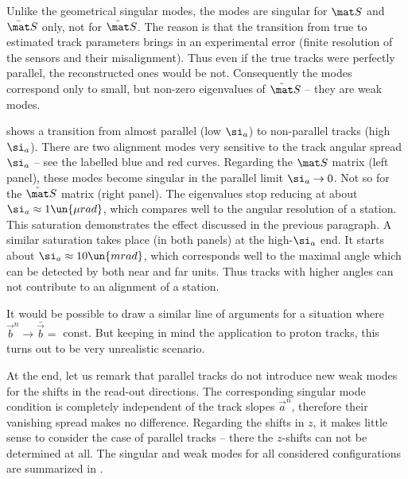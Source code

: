 
Unlike the geometrical singular modes, the modes  are singular for $\mat S$ and $\bar\mat S$ only, not for $\tilde\mat S$. The reason is that the transition  from true to estimated track parameters brings in an experimental error (finite resolution of the sensors and their misalignment). Thus even if the true tracks were perfectly parallel, the reconstructed ones would be not. Consequently the modes  correspond only to small, but non-zero eigenvalues of $\tilde\mat S$ -- they are weak modes.


 shows a transition from almost parallel (low $\si_a$) to non-parallel tracks (high $\si_a$). There are two alignment modes very sensitive to the track angular spread $\si_a$ -- see the labelled blue and red curves. Regarding the $\mat S$ matrix (left panel), these modes become singular in the parallel limit $\si_a \to 0$. Not so for the $\tilde\mat S$ matrix (right panel). The eigenvalues stop reducing at about $\si_a\approx 1\un{\mu rad}$, which compares well to the angular resolution of a station. This saturation demonstrates the effect discussed in the previous paragraph. A similar saturation takes place (in both panels) at the high-$\si_a$ end. It starts about $\si_a \approx 10\un{mrad}$, which corresponds well to the maximal angle which can be detected by both near and far units. Thus tracks with higher angles can not contribute to an alignment of a station.

It would be possible to draw a similar line of arguments for a situation where $\vec b^n\to \bar\vec b = $ const. But keeping in mind the application to  proton tracks, this turns out to be very unrealistic scenario.

At the end, let us remark that parallel tracks do not introduce new weak modes for the shifts in the read-out directions. The corresponding singular mode condition  is completely independent of the track slopes $\vec a^n$, therefore their vanishing spread makes no difference. Regarding the shifts in $z$, it makes little sense to consider the case of parallel tracks -- there the $z$-shifts can not be determined at all. The singular and weak modes for all considered configurations are summarized in .

